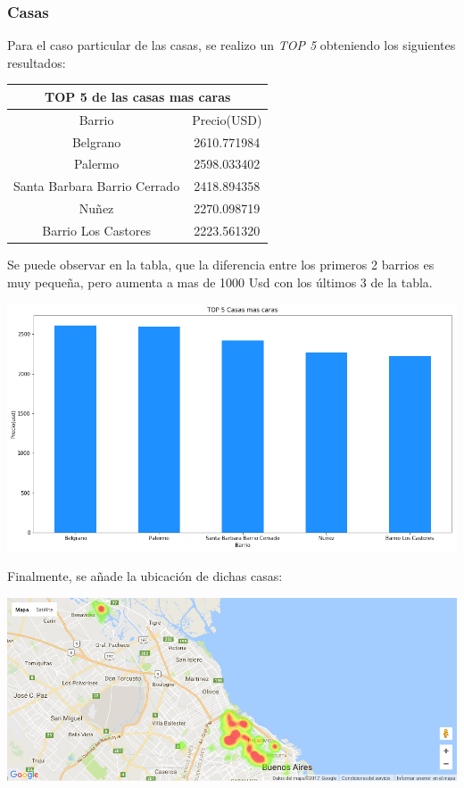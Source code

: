 \documentclass[a4paper, 10pt]{article}
\begin{document}
				\subsubsection{Casas}
				Para el caso particular de las casas, se realizo un \emph{TOP 5} obteniendo los siguientes resultados:
				
					\begin{center}
						\begin{tabular}{ |c|c| }
							\hline
							\multicolumn{2}{|c|}{TOP 5 de las casas mas caras}\\
							\hline
							\hline
							Barrio & Precio(USD)\\
							\hline
							 Belgrano & 2610.771984 \\
							 Palermo & 2598.033402 \\
							 Santa Barbara Barrio Cerrado & 2418.894358 \\
							 Nuñez & 2270.098719 \\
							 Barrio Los Castores & 2223.561320 \\
							\hline
						\end{tabular}
					\end{center}
				
				Se puede observar en la tabla, que la diferencia entre los primeros 2 barrios es muy pequeña, pero aumenta a mas de 1000 Usd con los últimos 3 de la tabla.
				
				\begin{center}
   		    				\includegraphics[width=\textwidth]{images/topCc}
				\end{center}
				
				Finalmente, se añade la ubicación de dichas casas:
				
				\begin{center}
   		    				\includegraphics[width=\textwidth]{images/ubicCc}
				\end{center}
 
\end{document}
